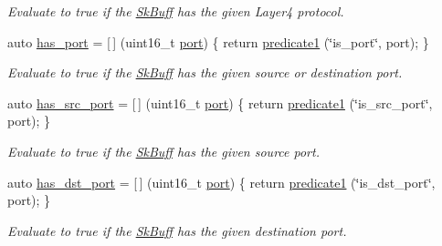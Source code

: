 \begin{DoxyCompactItemize}
\begin{DoxyCompactList}\small\item\em Evaluate to {\ttfamily true} if the \hyperlink{structpfq_1_1lang_1_1SkBuff}{Sk\+Buff} has the given Layer4 protocol. \end{DoxyCompactList}\item 
auto \hyperlink{namespacepfq_1_1lang_1_1anonymous__namespace_02default_8hpp_03_a9f7161b8dfb842c5a845f413eb6bc82f}{has\+\_\+port} = \mbox{[}$\,$\mbox{]} (uint16\+\_\+t \hyperlink{namespacepfq_1_1lang_1_1anonymous__namespace_02default_8hpp_03_a868eca03290a037cb4e9b7075085888b}{port}) \{ return \hyperlink{namespacepfq_1_1lang_a3e018f096545ca95a68e67027c8e3144}{predicate1} (\char`\"{}is\+\_\+port\char`\"{}, port); \}
\begin{DoxyCompactList}\small\item\em Evaluate to {\ttfamily true} if the \hyperlink{structpfq_1_1lang_1_1SkBuff}{Sk\+Buff} has the given source or destination port. \end{DoxyCompactList}\item 
auto \hyperlink{namespacepfq_1_1lang_1_1anonymous__namespace_02default_8hpp_03_a964d5ed41f50a1f3a04176f8e54d7a5a}{has\+\_\+src\+\_\+port} = \mbox{[}$\,$\mbox{]} (uint16\+\_\+t \hyperlink{namespacepfq_1_1lang_1_1anonymous__namespace_02default_8hpp_03_a868eca03290a037cb4e9b7075085888b}{port}) \{ return \hyperlink{namespacepfq_1_1lang_a3e018f096545ca95a68e67027c8e3144}{predicate1} (\char`\"{}is\+\_\+src\+\_\+port\char`\"{}, port); \}
\begin{DoxyCompactList}\small\item\em Evaluate to {\ttfamily true} if the \hyperlink{structpfq_1_1lang_1_1SkBuff}{Sk\+Buff} has the given source port. \end{DoxyCompactList}\item 
auto \hyperlink{namespacepfq_1_1lang_1_1anonymous__namespace_02default_8hpp_03_afa71ece0f4178d0200c0388f503eef14}{has\+\_\+dst\+\_\+port} = \mbox{[}$\,$\mbox{]} (uint16\+\_\+t \hyperlink{namespacepfq_1_1lang_1_1anonymous__namespace_02default_8hpp_03_a868eca03290a037cb4e9b7075085888b}{port}) \{ return \hyperlink{namespacepfq_1_1lang_a3e018f096545ca95a68e67027c8e3144}{predicate1} (\char`\"{}is\+\_\+dst\+\_\+port\char`\"{}, port); \}
\begin{DoxyCompactList}\small\item\em Evaluate to {\ttfamily true} if the \hyperlink{structpfq_1_1lang_1_1SkBuff}{Sk\+Buff} has the given destination port. \end{DoxyCompactList}\item 

\end{DoxyCompactItemize}
